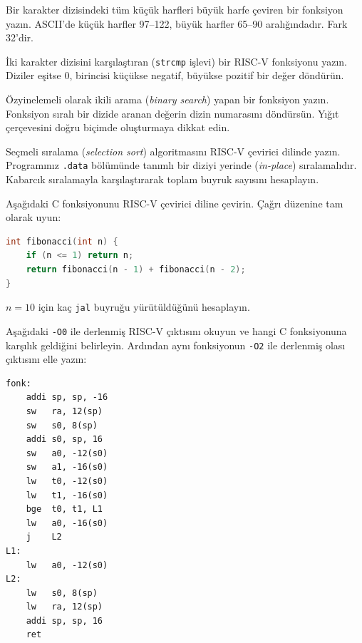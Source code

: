 \begin{alistirma}[\kolay]
Bir karakter dizisindeki tüm küçük harfleri büyük harfe çeviren bir fonksiyon yazın. ASCII'de küçük harfler 97--122, büyük harfler 65--90 aralığındadır. Fark 32'dir.
\end{alistirma}

\begin{alistirma}[\kolay]
İki karakter dizisini karşılaştıran (\texttt{strcmp} işlevi) bir RISC-V fonksiyonu yazın. Diziler eşitse 0, birincisi küçükse negatif, büyükse pozitif bir değer döndürün.
\end{alistirma}

\begin{alistirma}[\orta]
Özyinelemeli olarak ikili arama (\emph{binary search}) yapan bir fonksiyon yazın. Fonksiyon sıralı bir dizide aranan değerin dizin numarasını döndürsün. Yığıt çerçevesini doğru biçimde oluşturmaya dikkat edin.
\end{alistirma}

\begin{alistirma}[\orta]
Seçmeli sıralama (\emph{selection sort}) algoritmasını RISC-V çevirici dilinde yazın. Programınız \texttt{.data} bölümünde tanımlı bir diziyi yerinde (\emph{in-place}) sıralamalıdır. Kabarcık sıralamayla karşılaştırarak toplam buyruk sayısını hesaplayın.
\end{alistirma}

\begin{alistirma}[\orta]
Aşağıdaki C fonksiyonunu RISC-V çevirici diline çevirin. Çağrı düzenine tam olarak uyun:
\begin{lstlisting}[language=C, style=alistirma-kod]
int fibonacci(int n) {
    if (n <= 1) return n;
    return fibonacci(n - 1) + fibonacci(n - 2);
}
\end{lstlisting}
$n = 10$ için kaç \texttt{jal} buyruğu yürütüldüğünü hesaplayın.
\end{alistirma}

\begin{alistirma}[\orta]
Aşağıdaki \texttt{-O0} ile derlenmiş RISC-V çıktısını okuyun ve hangi C fonksiyonuna karşılık geldiğini belirleyin. Ardından aynı fonksiyonun \texttt{-O2} ile derlenmiş olası çıktısını elle yazın:
\begin{lstlisting}[style=riscv]
fonk:
    addi sp, sp, -16
    sw   ra, 12(sp)
    sw   s0, 8(sp)
    addi s0, sp, 16
    sw   a0, -12(s0)
    sw   a1, -16(s0)
    lw   t0, -12(s0)
    lw   t1, -16(s0)
    bge  t0, t1, L1
    lw   a0, -16(s0)
    j    L2
L1:
    lw   a0, -12(s0)
L2:
    lw   s0, 8(sp)
    lw   ra, 12(sp)
    addi sp, sp, 16
    ret
\end{lstlisting}
\end{alistirma}

